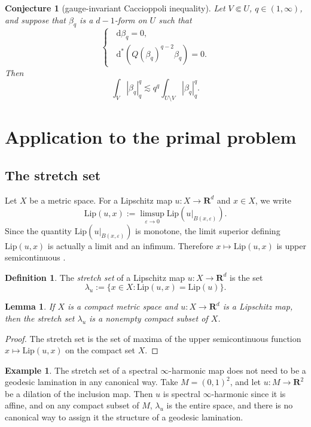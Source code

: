 \documentclass[reqno,11pt]{amsart}
\newcommand{\RR}{\mathbf{R}}
\newcommand*\dif{\mathop{}\!\mathrm{d}}
\newcommand{\Lip}{\mathrm{Lip}}
\newcommand{\dfn}[1]{\emph{#1}\index{#1}}
\newtheorem{lemma}[theorem]{Lemma}
\newtheorem{conjecture}[theorem]{Conjecture}
\theoremstyle{definition}
\newtheorem{definition}[theorem]{Definition}
\newtheorem{example}[theorem]{Example}
\numberwithin{equation}{section}
\begin{document}
\begin{conjecture}[gauge-invariant Caccioppoli inequality]
Let $V \Subset U$, $q \in (1, \infty)$, and suppose that $\beta_q$ is a $d - 1$-form on $U$ such that 
$$\begin{cases}
  \dif \beta_q = 0, \\
  \dif^*(Q(\beta_q)^{q - 2} \beta_q) = 0.
\end{cases}$$
Then 
$$\int_V |\beta_q|_{q}^q \lesssim q^q \int_{U \setminus V} |\beta_q|_{q}^q.$$
\end{conjecture}

\section{Application to the primal problem}
\subsection{The stretch set}
Let $X$ be a metric space.
For a Lipschitz map $u: X \to \RR^d$ and $x \in X$, we write 
$$\Lip(u, x) := \limsup_{\varepsilon \to 0} \Lip(u|_{B(x, \varepsilon)}).$$
Since the quantity $\Lip(u|_{B(x, \varepsilon)})$ is monotone, the limit superior defining $\Lip(u, x)$ is actually a limit and an infimum.
Therefore $x \mapsto \Lip(u, x)$ is upper semicontinuous \cite[Lemma 4.2]{Crandall2008}.

\begin{definition}
The \dfn{stretch set} of a Lipschitz map $u: X \to \RR^d$ is the set 
$$\lambda_u := \{x \in X: \Lip(u, x) = \Lip(u)\}.$$
\end{definition}

\begin{lemma}\label{stretch set is compact}
If $X$ is a compact metric space and $u: X \to \RR^d$ is a Lipschitz map, then the stretch set $\lambda_u$ is a nonempty compact subset of $X$.
\end{lemma}
\begin{proof}
The stretch set is the set of maxima of the upper semicontinuous function $x \mapsto \Lip(u, x)$ on the compact set $X$.
\end{proof}

\begin{example}
The stretch set of a spectral $\infty$-harmonic map does not need to be a geodesic lamination in any canonical way.
Take $M = (0, 1)^2$, and let $u: M \to \RR^2$ be a dilation of the inclusion map.
Then $u$ is spectral $\infty$-harmonic since it is affine, and on any compact subset of $M$, $\lambda_u$ is the entire space, and there is no canonical way to assign it the structure of a geodesic lamination.
\end{example}
\end{document}

